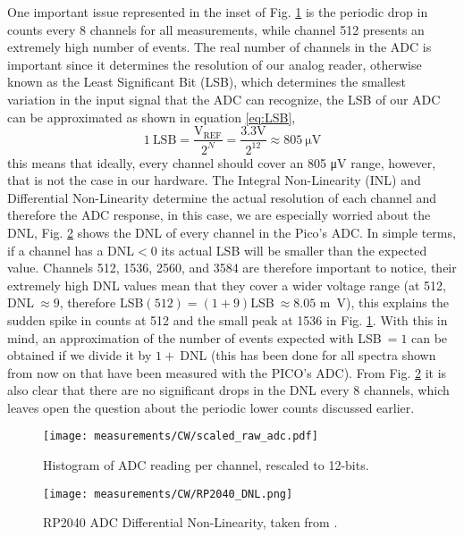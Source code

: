 One important issue represented in the inset of Fig. \ref{fig:CW_scaled} is the periodic drop in counts every 8 channels for all measurements, while channel 512 presents an extremely high number of events. The real number of channels in the ADC is important since it determines the resolution of our analog reader, otherwise known as the Least Significant Bit (LSB), which determines the smallest variation in the input signal that the ADC can recognize, the LSB of our ADC can be approximated as shown in equation \eqref{eq:LSB},
\begin{equation}\label{eq:LSB}
  1~\text{LSB} = \frac{\text{V}_\text{REF}}{2^N} = \frac{3.3 \unit{\V}}{2^{12}} \approx 805~\unit{\micro\V}
\end{equation}
this means that ideally, every channel should cover an 805 \unit{\micro\V} range, however, that is not the case in our hardware. The Integral Non-Linearity (INL) and Differential Non-Linearity determine the actual resolution of each channel and therefore the ADC response, in this case, we are especially worried about the DNL, Fig. \ref{fig:RP2040_DNL} shows the DNL of every channel in the Pico's ADC. In simple terms, if a channel has a DNL$<0$ its actual LSB will be smaller than the expected value. Channels 512, 1536, 2560, and 3584 are therefore important to notice, their extremely high DNL values mean that they cover a wider voltage range (at 512, DNL$~\approx9$, therefore LSB$(512)=(1+9)$LSB$~\approx 8.05$ \unit{\m\V}), this explains the sudden spike in counts at 512 and the small peak at 1536 in Fig. \ref{fig:CW_scaled}. With this in mind, an approximation of the number of events expected with LSB$~=1$ can be obtained if we divide it by $1+~$DNL (this has been done for all spectra shown from now on that have been measured with the PICO's ADC). From Fig. \ref{fig:RP2040_DNL} it is also clear that there are no significant drops in the DNL every 8 channels, which leaves open the question about the periodic lower counts discussed earlier.

\begin{figure}
  \centering
  \texttt{[image: measurements/CW/scaled\_raw\_adc.pdf]}
  \caption{\label{fig:CW_scaled}Histogram of ADC reading per channel, rescaled to 12-bits.}
\end{figure}

\begin{figure}
  \centering
  \texttt{[image: measurements/CW/RP2040\_DNL.png]}
  \caption{\label{fig:RP2040_DNL}RP2040 ADC Differential Non-Linearity, taken from \cite{datasheet2024rp2040}.}
\end{figure}

